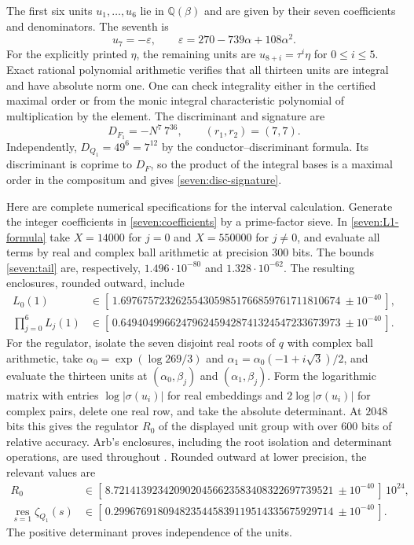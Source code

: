 The first six units $u_1,\ldots,u_6$ lie in $\mathbb Q(\beta)$ and are
given by their seven coefficients and denominators.
The seventh is
\[
 u_7=-\varepsilon,\qquad
 \varepsilon=270-739\alpha+108\alpha^2.
 \tag{S19}\label{seven:base-unit}
\]
For the explicitly printed $\eta$, the remaining units are
$u_{8+i}=\tau^i\eta$ for $0\le i\le5$.
Exact rational polynomial arithmetic verifies that all thirteen units are
integral and have absolute norm one. One can check integrality either in
the certified maximal order or from the monic integral characteristic
polynomial of multiplication by the element. The discriminant and
signature are
\[
 D_{F_1}=-N^7\,7^{36},\qquad (r_1,r_2)=(7,7).
 \tag{S20}\label{seven:disc-signature}
\]
Independently, $D_{Q_1}=49^6=7^{12}$ by the conductor--discriminant
formula. Its discriminant is coprime to $D_F$, so the product of the
integral bases is a maximal order in the compositum and gives
\eqref{seven:disc-signature}.

Here are complete numerical specifications for the interval calculation.
Generate the integer coefficients in \eqref{seven:coefficients} by a
prime-factor sieve. In \eqref{seven:L1-formula} take $X=14000$ for $j=0$
and $X=550000$ for $j\ne0$, and evaluate all terms by real and complex
ball arithmetic at precision $300$ bits.
The bounds \eqref{seven:tail} are, respectively,
$1.496\cdot10^{-80}$ and $1.328\cdot10^{-62}$.
The resulting enclosures, rounded outward, include
\[
\begin{split}
 L_0(1)&\in
 [\,1.6976757232625543059851766859761711810674
       \ \pm 10^{-40}\,],\\
 \prod_{j=0}^6L_j(1)&\in
 [\,0.6494049966247962459428741324547233673973
       \ \pm 10^{-40}\,].
\end{split}
 \tag{S21}\label{seven:analytic-intervals}
\]
For the regulator, isolate the seven disjoint real roots of $q$ with
complex ball arithmetic, take
$\alpha_0=\exp(\log269/3)$ and
$\alpha_1=\alpha_0(-1+i\sqrt3)/2$, and evaluate the thirteen units at
$(\alpha_0,\beta_j)$ and $(\alpha_1,\beta_j)$.
Form the logarithmic matrix with entries $\log|\sigma(u_i)|$ for real
embeddings and $2\log|\sigma(u_i)|$ for complex pairs, delete one real
row, and take the absolute determinant.
At $2048$ bits this gives the regulator $R_0$ of the displayed unit group
with over $600$ bits of relative accuracy. Arb's enclosures, including
the root isolation and determinant operations, are used throughout
\cite{sevenJohansson2017}.
Rounded outward at lower precision, the relevant values are
\[
\begin{split}
 R_0&\in
 [\,8.7214139234209020456623583408322697739521
       \ \pm10^{-40}\,]\,10^{24},\\
 \operatorname*{res}_{s=1}\zeta_{Q_1}(s)
   &\in[\,0.2996769180948235445839119514335675929714
       \ \pm10^{-40}\,].
\end{split}
 \tag{S22}\label{seven:regulator-intervals}
\]
The positive determinant proves independence of the units.

